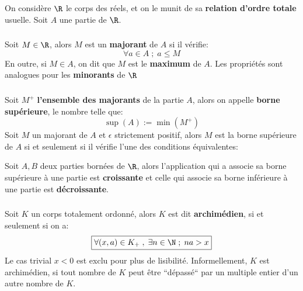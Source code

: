 \chapter*{}
On considère \(\R\) le corps des réels, et on le munit de sa \textbf{relation d'ordre totale} usuelle.\+
Soit \(A\) une partie de \(\R\).

\subsection*{}
Soit \(M \in \R\), alors \(M\) est un \textbf{majorant} de \(A\) si il vérifie:
\[
    \forall a \in A \; ; \; a \leq M
\]
En outre, si \(M \in A\), on dit que \(M\) est le \textbf{maximum} de \(A\). Les propriétés sont analogues pour les \textbf{minorants} de \(\R\)

\subsection*{}
Soit \(M^+\) \textbf{l'ensemble des majorants} de la partie \(A\), alors on appelle \textbf{borne supérieure}, le nombre telle que:
\[
    \sup(A) := \min(M^+)
\]
Soit \(M\) un majorant de \(A\) et \(\epsilon\) strictement positif, alors \(M\) est la borne supérieure de \(A\) si et seulement si il vérifie l'une des conditions équivalentes:
\begin{center}
    \setlength{\fboxsep}{0.3em}
\end{center}

Soit \(A, B\) deux parties bornées de \(\R\), alors l'application qui a associe sa borne supérieure à une partie est \textbf{croissante} et celle qui associe sa borne inférieure à une partie est \textbf{décroissante}.

\subsection*{}
Soit \(K\) un corps totalement ordonné, alors \(K\) est dit \textbf{archimédien}, si et seulement si on a:
\[
    \boxed{
        \forall (x, a) \in K_+ \; , \; \exists n \in \N \; ; \; na > x
    }
\]
Le cas trivial \(x < 0\) est exclu pour plus de lisibilité.\+
Informellement, \(K\) est archimédien, si tout nombre de \(K\) peut être ``dépassé`` par un multiple entier d'un autre nombre de \(K\).\<

